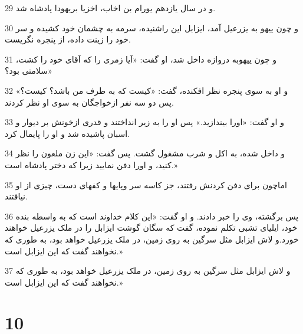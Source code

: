 \par 29 و در سال یازدهم یورام بن اخاب، اخزیا بریهودا پادشاه شد.
\par 30 و چون ییهو به یزرعیل آمد، ایزابل این راشنیده، سرمه به چشمان خود کشیده و سر خود را زینت داده، از پنجره نگریست.
\par 31 و چون ییهوبه دروازه داخل شد، او گفت: «آیا زمری را که آقای خود را کشت، سلامتی بود؟»
\par 32 و او به سوی پنجره نظر افکنده، گفت: «کیست که به طرف من باشد؟ کیست؟» پس دو سه نفر ازخواجگان به سوی او نظر کردند.
\par 33 و او گفت: «اورا بیندازید.» پس او را به زیر انداختند و قدری ازخونش بر دیوار و اسبان پاشیده شد و او را پایمال کرد.
\par 34 و داخل شده، به اکل و شرب مشغول گشت. پس گفت: «این زن ملعون را نظر کنید، و اورا دفن نمایید زیرا که دختر پادشاه است.»
\par 35 اماچون برای دفن کردنش رفتند، جز کاسه سر وپایها و کفهای دست، چیزی از او نیافتند.
\par 36 پس برگشته، وی را خبر دادند. و او گفت: «این کلام خداوند است که به واسطه بنده خود، ایلیای تشبی تکلم نموده، گفت که سگان گوشت ایزابل را در ملک یزرعیل خواهند خورد.و لاش ایزابل مثل سرگین به روی زمین، در ملک یزرعیل خواهد بود، به طوری که نخواهند گفت که این ایزابل است.»
\par 37 و لاش ایزابل مثل سرگین به روی زمین، در ملک یزرعیل خواهد بود، به طوری که نخواهند گفت که این ایزابل است.»
 
\chapter{10}

